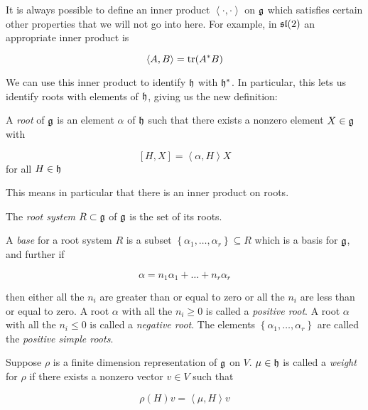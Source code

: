 It is always possible to define an inner product $\left<\cdot,\cdot\right>$ on
$\mathfrak{g}$ which satisfies certain other properties that we will not go into here. For
example, in $\mathfrak{sl}(2)$ an appropriate inner product is 

\begin{equation}
\left<A,B\right> = \operatorname{tr}(A^*B)
\end{equation}

We can use this inner product to identify $\mathfrak{h}$ with $\mathfrak{h}^*$. In
particular, this lets us identify roots with elements of $\mathfrak{h}$, giving us
the new definition:

\begin{defn}
A \emph{root} of $\mathfrak{g}$ is an element $\alpha$ of $\mathfrak{h}$
such that there exists a nonzero element $X \in \mathfrak{g}$ with 

\begin{equation}
\left[ H,X \right] = \left<\alpha,H\right>X
\end{equation}
for all $H \in \mathfrak{h}$
\end{defn}

This means in particular that there is an inner product on roots. 

The \emph{root system} $R \subset \mathfrak{g}$ of $\mathfrak{g}$ is the set of its roots. 

\begin{defn}
A \emph{base} for a root system $R$ is a subset $\left\{ \alpha_1, \ldots,
\alpha_r \right\} \subseteq R$ which is a basis for $\mathfrak{g}$, and further if 

\begin{equation}
\alpha = n_1 \alpha_1 + \ldots + n_r \alpha_r
\end{equation}

then either all the $n_i$ are greater than or equal to zero or all the $n_i$
are less than or equal to zero. A root $\alpha$ with all the $n_i \geq 0$ is
called a \emph{positive root}. A root $\alpha$ with all the $n_i \leq 0$ is
called a \emph{negative root}. The elements $\left\{ \alpha_1, \ldots, \alpha_r
\right\}$ are called the \emph{positive simple roots}.
\end{defn}

Suppose $\rho$ is a finite dimension representation of $\mathfrak{g}$ on $V$. $\mu \in \mathfrak{h}$ is called a \emph{weight} for $\rho$ if there exists a nonzero vector $v \in V$ such that 

\begin{equation}
\rho(H)v = \left<\mu, H\right> v
\end{equation}

